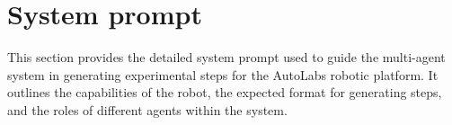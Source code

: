 \documentclass[sn-nature, twocolumn]{sn-jnl}%
\theoremstyle{thmstyleone}%
\theoremstyle{thmstyletwo}%
\theoremstyle{thmstylethree}%
\begin{document}
% 
% 
% 




\maketitle



\section{System prompt}
This section provides the detailed system prompt used to guide the multi-agent system in generating experimental steps for the AutoLabs robotic platform. It outlines the capabilities of the robot, the expected format for generating steps, and the roles of different agents within the system.
\end{document}
